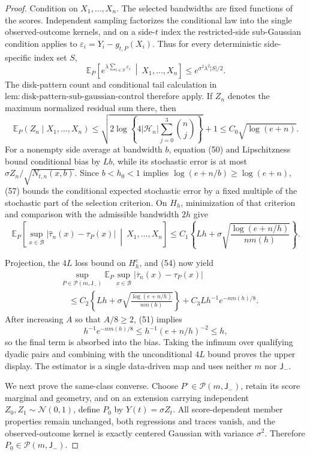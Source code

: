 \documentclass{article}
\begin{document}
\begin{proof}
Condition on \(X_1,\ldots,X_n\).  The selected bandwidths are fixed
functions of the scores.  Independent sampling factorizes the conditional
law into the single observed-outcome kernels, and on a side-\(t\) index
the restricted-side sub-Gaussian condition applies to
\(\varepsilon_i=Y_i-g_{t,P}(X_i)\).  Thus for every deterministic
side-specific index set \(S\),
\[
 \mathbb E_P\!\left[
 e^{\lambda\sum_{i\in S}\varepsilon_i}
 \ \middle|\ X_1,\ldots,X_n\right]
 \le e^{\sigma^2\lambda^2|S|/2}.
 \tag{56}
\]
The disk-pattern count and conditional tail calculation in
\(\mathrm{lem:disk\text{-}pattern\text{-}sub\text{-}gaussian\text{-}control}\)
therefore apply.  If \(Z_n\) denotes the maximum normalized residual sum
there, then
\[
 \mathbb E_P(Z_n\mid X_1,\ldots,X_n)
 \le\sqrt{2\log\!\left\{4|\mathcal H_n|
              \sum_{j=0}^3\binom nj\right\}}+1
 \le C_0\sqrt{\log(e+n)}.
 \tag{57}
\]
For a nonempty side average at bandwidth \(b\), equation (50) and
Lipschitzness bound conditional bias by \(Lb\), while its stochastic
error is at most \(\sigma Z_n/\sqrt{N_{t,n}(x,b)}\).  Since \(b<h_0<1\)
implies \(\log(e+n/b)\ge\log(e+n)\), (57) bounds the conditional expected
stochastic error by a fixed multiple of the stochastic part of the
selection criterion.  On \(H_h\), minimization of that criterion and
comparison with the admissible bandwidth \(2h\) give
\[
 \mathbb E_P\!\left[
 \sup_{x\in\mathcal B}|\widehat\tau_n(x)-\tau_P(x)|
 \ \middle|\ X_1,\ldots,X_n\right]
 \le C_1\left\{Lh+
 \sigma\sqrt{\frac{\log(e+n/h)}{nm(h)}}\right\}.
 \tag{58}
\]

Projection, the \(4L\) loss bound on \(H_h^c\), and (54) now yield
\[
 \begin{aligned}
 &\sup_{P\in\mathcal P(m,\mathsf J_{-})}
 \mathbb E_P\sup_{x\in\mathcal B}
 |\overline\tau_n(x)-\tau_P(x)|\\
 &\quad\le C_2\left\{Lh+
 \sigma\sqrt{\frac{\log(e+n/h)}{nm(h)}}\right\}
 +C_3Lh^{-1}e^{-nm(h)/8}.
 \end{aligned}
 \tag{59}
\]
After increasing \(A\) so that \(A/8\ge2\), (51) implies
\[
 h^{-1}e^{-nm(h)/8}\le h^{-1}(e+n/h)^{-2}\le h,
\]
so the final term is absorbed into the bias.  Taking the infimum over
qualifying dyadic pairs and combining with the unconditional \(4L\)
bound proves the upper display.  The estimator is a single data-driven
map and uses neither \(m\) nor \(\mathsf J_{-}\).

We next prove the same-class converse.  Choose
\(P^\circ\in\mathcal P(m,\mathsf J_{-})\), retain its score marginal and
geometry, and on an extension carrying independent
\(Z_0,Z_1\sim\mathcal N(0,1)\), define \(P_0\) by
\(Y(t)=\sigma Z_t\).  All score-dependent member properties remain
unchanged, both regressions and traces vanish, and the observed-outcome
kernel is exactly centered Gaussian with variance \(\sigma^2\).
Therefore \(P_0\in\mathcal P(m,\mathsf J_{-})\).


\end{proof}
\end{document}
